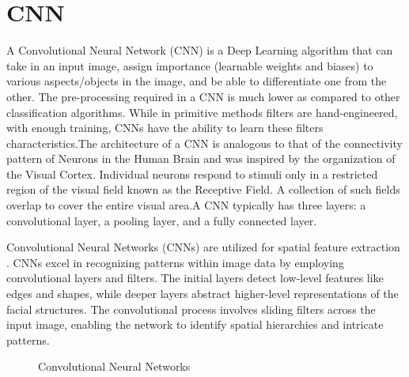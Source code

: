         \section{CNN}
        A Convolutional Neural Network (CNN) is a Deep Learning algorithm
        that can take in an input image, assign importance (learnable weights and biases) to various aspects/objects in the image, and be able to differentiate one from the other. The pre-processing required in a CNN is much lower as compared to other classification algorithms. While in primitive methods filters are hand-engineered, with enough training, CNNs have the ability to learn these filters characteristics.The architecture of a CNN is analogous to that of the connectivity pattern of Neurons in the Human Brain and was inspired by the organization of the Visual Cortex. Individual neurons respond to stimuli only in a restricted region of the visual field known as the Receptive Field. A collection of such fields overlap to cover the entire visual area.A CNN typically has three layers: a convolutional layer, a pooling layer, and a fully connected layer.

        Convolutional Neural Networks (CNNs) are utilized for spatial feature extraction . CNNs excel in recognizing patterns within image data by employing
        convolutional layers and filters. The initial layers detect low-level features
        like edges and shapes, while deeper layers abstract higher-level representations of the facial structures. The convolutional process involves
        sliding filters across the input image, enabling the network to identify spatial hierarchies and intricate patterns.
        \begin{figure}[hbt!]
                \caption{Convolutional Neural Networks}
        \end{figure}

